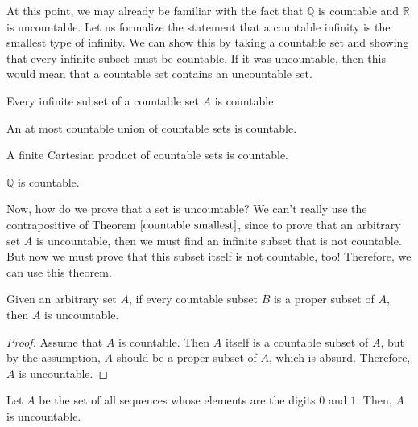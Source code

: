\documentclass{article}
\begin{document}
    At this point, we may already be familiar with the fact that $\mathbb{Q}$ is countable and $\mathbb{R}$ is uncountable. Let us formalize the statement that a countable infinity is the smallest type of infinity. We can show this by taking a countable set and showing that every infinite subset must be countable. If it was uncountable, then this would mean that a countable set contains an uncountable set. 

    \begin{theorem}
    \label{countable smallest}
    Every infinite subset of a countable set $A$ is countable. 
    \end{theorem}

    \begin{theorem}
    An at most countable union of countable sets is countable. 
    \end{theorem}

    \begin{theorem}
    A finite Cartesian product of countable sets is countable. 
    \end{theorem}

    \begin{corollary}
    $\mathbb{Q}$ is countable. 
    \end{corollary}

    Now, how do we prove that a set is uncountable? We can't really use the contrapositive of Theorem $\ref{countable smallest}$, since to prove that an arbitrary set $A$ is uncountable, then we must find an infinite subset that is not countable. But now we must prove that this subset itself is not countable, too! Therefore, we can use this theorem. 

    \begin{theorem}
    Given an arbitrary set $A$, if every countable subset $B$ is a proper subset of $A$, then $A$ is uncountable. 
    \end{theorem}
    \begin{proof}
    Assume that $A$ is countable. Then $A$ itself is a countable subset of $A$, but by the assumption, $A$ should be a proper subset of $A$, which is absurd. Therefore, $A$ is uncountable. 
    \end{proof}

    \begin{theorem}
    Let $A$ be the set of all sequences whose elements are the digits $0$ and $1$. Then, $A$ is uncountable. 
    \end{theorem}
\end{document}
